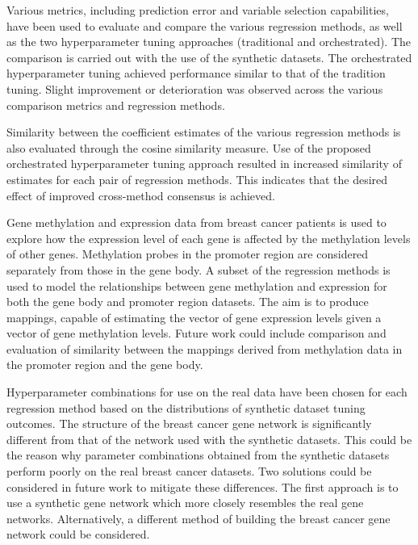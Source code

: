 Various metrics, including prediction error and variable selection capabilities, have been used to evaluate and compare the various regression methods, as well as the two hyperparameter tuning approaches (traditional and orchestrated). The comparison is carried out with the use of the synthetic datasets. The orchestrated hyperparameter tuning achieved performance similar to that of the tradition tuning. Slight improvement or deterioration was observed across the various comparison metrics and regression methods.

Similarity between the coefficient estimates of the various regression methods is also evaluated through the cosine similarity measure. Use of the proposed orchestrated hyperparameter tuning approach resulted in increased similarity of estimates for each pair of regression methods. This indicates that the desired effect of improved cross-method consensus is achieved.

Gene methylation and expression data from breast cancer patients is used to explore how the expression level of each gene is affected by the methylation levels of other genes. Methylation probes in the promoter region are considered separately from those in the gene body. A subset of the regression methods is used to model the relationships between gene methylation and expression for both the gene body and promoter region datasets. The aim is to produce mappings, capable of estimating the vector of gene expression levels given a vector of gene methylation levels. Future work could include comparison and evaluation of similarity between the mappings derived from methylation data in the promoter region and the gene body.

Hyperparameter combinations for use on the real data have been chosen for each regression method based on the distributions of synthetic dataset tuning outcomes. The structure of the breast cancer gene network is significantly different from that of the network used with the synthetic datasets. This could be the reason why parameter combinations obtained from the synthetic datasets perform poorly on the real breast cancer datasets. Two solutions could be considered in future work to mitigate these differences. The first approach is to use a synthetic gene network which more closely resembles the real gene networks. Alternatively, a different method of building the breast cancer gene network could be considered. 
